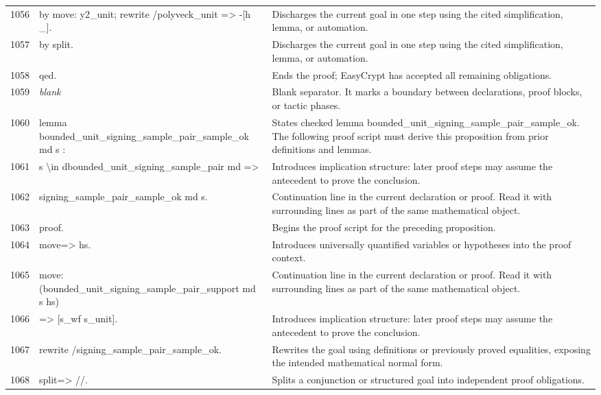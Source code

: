 \documentclass[10pt]{article}
\begin{document}
\begin{longtable}{r L{0.53\textwidth} L{0.37\textwidth}}
1056 & {\ttfamily\scriptsize   by move: y2\_unit; rewrite /polyveck\_unit => -[h \_].} & Discharges the current goal in one step using the cited simplification, lemma, or automation. \\
1057 & {\ttfamily\scriptsize by split.} & Discharges the current goal in one step using the cited simplification, lemma, or automation. \\
1058 & {\ttfamily\scriptsize qed.} & Ends the proof; EasyCrypt has accepted all remaining obligations. \\
1059 & {\ttfamily\scriptsize \emph{blank}} & Blank separator.  It marks a boundary between declarations, proof blocks, or tactic phases. \\
1060 & {\ttfamily\scriptsize lemma bounded\_unit\_signing\_sample\_pair\_sample\_ok md s :} & States checked lemma bounded\_unit\_signing\_sample\_pair\_sample\_ok.  The following proof script must derive this proposition from prior definitions and lemmas. \\
1061 & {\ttfamily\scriptsize   s \textbackslash{}in dbounded\_unit\_signing\_sample\_pair md =>} & Introduces implication structure: later proof steps may assume the antecedent to prove the conclusion. \\
1062 & {\ttfamily\scriptsize   signing\_sample\_pair\_sample\_ok md s.} & Continuation line in the current declaration or proof.  Read it with surrounding lines as part of the same mathematical object. \\
1063 & {\ttfamily\scriptsize proof.} & Begins the proof script for the preceding proposition. \\
1064 & {\ttfamily\scriptsize move=> hs.} & Introduces universally quantified variables or hypotheses into the proof context. \\
1065 & {\ttfamily\scriptsize move: (bounded\_unit\_signing\_sample\_pair\_support md s hs)} & Continuation line in the current declaration or proof.  Read it with surrounding lines as part of the same mathematical object. \\
1066 & {\ttfamily\scriptsize   => [s\_wf s\_unit].} & Introduces implication structure: later proof steps may assume the antecedent to prove the conclusion. \\
1067 & {\ttfamily\scriptsize rewrite /signing\_sample\_pair\_sample\_ok.} & Rewrites the goal using definitions or previously proved equalities, exposing the intended mathematical normal form. \\
1068 & {\ttfamily\scriptsize split=> //.} & Splits a conjunction or structured goal into independent proof obligations. \\

\end{longtable}
\end{document}
